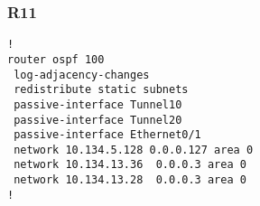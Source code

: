 \subsubsection{R11}
{\small
\begin{verbatim}
!
router ospf 100
 log-adjacency-changes
 redistribute static subnets
 passive-interface Tunnel10
 passive-interface Tunnel20
 passive-interface Ethernet0/1
 network 10.134.5.128 0.0.0.127 area 0
 network 10.134.13.36  0.0.0.3 area 0
 network 10.134.13.28  0.0.0.3 area 0
!
\end{verbatim}
}
